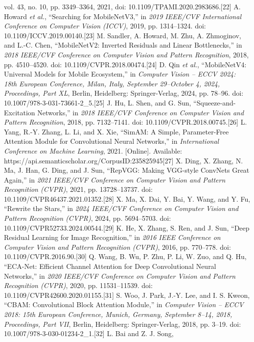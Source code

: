 \documentclass[
]{article}
\begin{document}
vol. 43, no. 10, pp. 3349--3364, 2021, doi:
10.1109/TPAMI.2020.2983686.{[}22{]} A. Howard \emph{et al.}, ``Searching
for MobileNetV3,'' in \emph{2019 IEEE/CVF International Conference on
Computer Vision (ICCV)}, 2019, pp. 1314--1324. doi:
10.1109/ICCV.2019.00140.{[}23{]} M. Sandler, A. Howard, M. Zhu, A.
Zhmoginov, and L.-C. Chen, ``MobileNetV2: Inverted Residuals and Linear
Bottlenecks,'' in \emph{2018 IEEE/CVF Conference on Computer Vision and
Pattern Recognition}, 2018, pp. 4510--4520. doi:
10.1109/CVPR.2018.00474.{[}24{]} D. Qin \emph{et al.}, ``MobileNetV4:
Universal Models for Mobile Ecosystem,'' in \emph{Computer Vision --
ECCV 2024: 18th European Conference, Milan, Italy, September 29--October
4, 2024, Proceedings, Part XL}, Berlin, Heidelberg: Springer-Verlag,
2024, pp. 78--96. doi: 10.1007/978-3-031-73661-2\_5.{[}25{]} J. Hu, L.
Shen, and G. Sun, ``Squeeze-and-Excitation Networks,'' in \emph{2018
IEEE/CVF Conference on Computer Vision and Pattern Recognition}, 2018,
pp. 7132--7141. doi: 10.1109/CVPR.2018.00745.{[}26{]} L. Yang, R.-Y.
Zhang, L. Li, and X. Xie, ``SimAM: A Simple, Parameter-Free Attention
Module for Convolutional Neural Networks,'' in \emph{International
Conference on Machine Learning}, 2021. {[}Online{]}. Available:
https://api.semanticscholar.org/CorpusID:235825945{[}27{]} X. Ding, X.
Zhang, N. Ma, J. Han, G. Ding, and J. Sun, ``RepVGG: Making VGG-style
ConvNets Great Again,'' in \emph{2021 IEEE/CVF Conference on Computer
Vision and Pattern Recognition (CVPR)}, 2021, pp. 13728--13737. doi:
10.1109/CVPR46437.2021.01352.{[}28{]} X. Ma, X. Dai, Y. Bai, Y. Wang,
and Y. Fu, ``Rewrite the Stars,'' in \emph{2024 IEEE/CVF Conference on
Computer Vision and Pattern Recognition (CVPR)}, 2024, pp. 5694--5703.
doi: 10.1109/CVPR52733.2024.00544.{[}29{]} K. He, X. Zhang, S. Ren, and
J. Sun, ``Deep Residual Learning for Image Recognition,'' in \emph{2016
IEEE Conference on Computer Vision and Pattern Recognition (CVPR)},
2016, pp. 770--778. doi: 10.1109/CVPR.2016.90.{[}30{]} Q. Wang, B. Wu,
P. Zhu, P. Li, W. Zuo, and Q. Hu, ``ECA-Net: Efficient Channel Attention
for Deep Convolutional Neural Networks,'' in \emph{2020 IEEE/CVF
Conference on Computer Vision and Pattern Recognition (CVPR)}, 2020, pp.
11531--11539. doi: 10.1109/CVPR42600.2020.01155.{[}31{]} S. Woo, J.
Park, J.-Y. Lee, and I. S. Kweon, ``CBAM: Convolutional Block Attention
Module,'' in \emph{Computer Vision -- ECCV 2018: 15th European
Conference, Munich, Germany, September 8--14, 2018, Proceedings, Part
VII}, Berlin, Heidelberg: Springer-Verlag, 2018, pp. 3--19. doi:
10.1007/978-3-030-01234-2\_1.{[}32{]} L. Bai and Z. J. Song,
\end{document}
